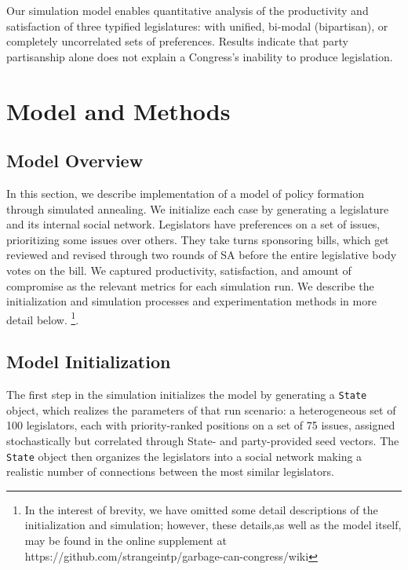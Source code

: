 \documentclass[pdftex,12pt,oribibl]{llncs}
\begin{document}
Our simulation model enables quantitative analysis of the productivity and satisfaction of three typified legislatures: with unified, bi-modal (bipartisan), or completely uncorrelated sets of preferences. 
Results indicate that party partisanship alone does not explain a Congress's inability to produce legislation.

\section{Model and Methods}
%
%

\subsection{Model Overview}
In this section, we describe implementation of a model of policy formation through simulated annealing.
We initialize each case by generating a legislature and its internal social network. 
Legislators have preferences on a set of issues, prioritizing some issues over others.
They take turns sponsoring bills, which get reviewed and revised through two rounds of SA before the entire legislative body votes on the bill.
We captured productivity, satisfaction, and amount of compromise as the relevant metrics for each simulation run.
We describe the initialization and simulation processes and experimentation methods in more detail below.
\footnote{In the interest of brevity, we have omitted some detail descriptions of the initialization and simulation; however, these details,as well as the model itself, may be found in the online supplement at https://github.com/strangeintp/garbage-can-congress/wiki}.

\subsection{Model Initialization}
The first step in the simulation initializes the model by generating a \texttt{State} object, which realizes the parameters of that run scenario: a heterogeneous set of 100 legislators, each with priority-ranked positions on a set of 75 issues, assigned stochastically but correlated through State- and party-provided seed vectors. 
The \texttt{State} object then organizes the legislators into a social network making a realistic number of connections between the most similar legislators.
\end{document}
